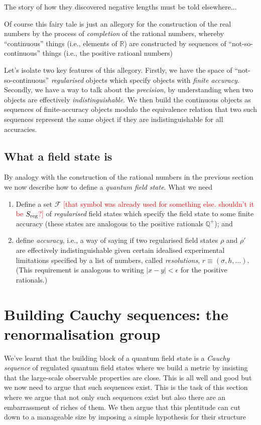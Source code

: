 \documentclass[11pt]{amsart}
\newcommand{\red}[1]{\textcolor{red}{#1}}
\theoremstyle{plain}%
\theoremstyle{definition}
\theoremstyle{remark}
\begin{document}
The story of how they discovered negative lengths must be told elsewhere...

Of course this fairy tale is just an allegory for the construction of the real numbers by the process of \emph{completion} of the rational numbers, whereby ``continuous'' things (i.e., elements of $\mathbb{R}$) are constructed by sequences of ``not-so-continuous'' things (i.e., the positive ratioanl numbers)

Let's isolate two key features of this allegory. Firstly, we have the space of ``not-so-continuous'' \emph{regularised} objects which specify objects with \emph{finite accuracy}. Secondly, we have a way to talk about the \emph{precision}, by understanding when two objects are effectively \emph{indistinguishable}. We then build the continuous objects as sequences of finite-accuracy objects modulo the equivalence relation that two such sequences represent the same object if they are indistinguishable for all accuracies.

\subsection{What a field state is}
By analogy with the construction of the rational numbers in the previous section we now describe how to define a \emph{quantum field state}. What we need 
\begin{enumerate} 
	\item Define a set $\mathcal{F}$ \red{[that symbol was already used for something else. shouldn't it be $S_{\rm reg}$?]} of \emph{regularised} field states which specify the field state to some finite accuracy (these states are analogous to the positive rationals $\mathbb{Q}^+$); and
	\item define \emph{accuracy}, i.e., a way of saying if two regularised field states $\rho$ and $\rho'$ are effectively indistinguishable given certain idealised experimental limitations specified by a list of numbers, called \emph{resolutions}, $r \equiv (\sigma, h, \ldots)$. (This requirement is analogous to writing $|x-y|<\epsilon$ for the positive rationals.)
\end{enumerate}


\section{Building Cauchy sequences: the renormalisation group}\label{sec:cauchyseqrg}

We've learnt that the building block of a quantum field state is a \emph{Cauchy sequence} of regulated quantum field states where we build a metric by insisting that the large-scale observable properties are close. This is all well and good but we now need to argue that such sequences exist. This is the task of this section where we argue that not only such sequences exist but also there are an embarrassment of riches of them. We then argue that this plentitude can cut down to a manageable size by imposing a simple hypothesis for their structure
\end{document}
